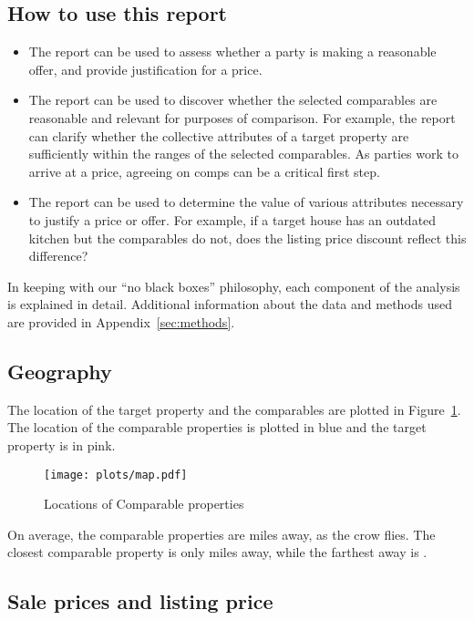 \documentclass[
12pt, %
letterpaper, %
oneside, %
headinclude,footinclude, %
BCOR5mm, %
]{scrartcl}
\begin{document}
\subsection{How to use this report}
\begin{itemize}
\item The report can be used to assess whether a party is making a reasonable offer, and provide justification for a price. 
\item The report can be used to discover whether the selected comparables are reasonable and relevant for purposes of comparison. 
For example, the report can clarify whether the collective attributes of a target property are sufficiently within the ranges of the selected comparables. As parties work to arrive at a price, agreeing on comps can be a critical first step. 
\item The report can be used to determine the value of various attributes necessary to justify a price or offer. For example, if a target house has an outdated kitchen but the comparables do not, does the listing price discount reflect this difference? 
\end{itemize} 

In keeping with our ``no black boxes'' philosophy, each component of the analysis is explained in detail. 
Additional information about the data and methods used are provided in Appendix~\ref{sec:methods}.

\subsection{Geography}
The location of the target property and the comparables are plotted in Figure~\ref{fig:map}.
The location of the comparable properties is plotted in blue and the target property is in pink. 

\begin{figure}[h!]
\centering
\caption{Locations of Comparable properties}  \label{fig:map}  
\texttt{[image: plots/map.pdf]} 
\end{figure}

On average, the comparable properties are \AvgDistance{} miles away, as the crow flies.
The closest comparable property is only \MinDistance{} miles away, while the farthest away is \MaxDistance{}. 
\States{}
\Cities{}

\subsection{Sale prices and \PropertyName{} listing price} 
\end{document}
